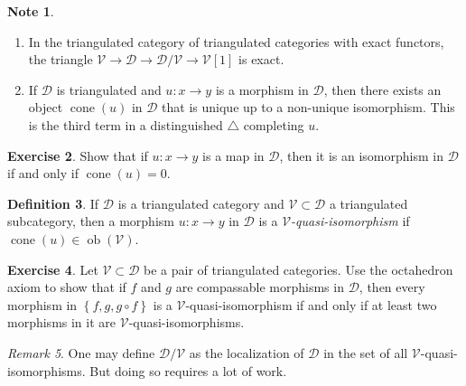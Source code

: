 \documentclass[10pt,letterpaper,cm]{nupset}
\theoremstyle{definition}
\newtheorem{definition}{Definition}[subsection]
\newtheorem{note}[definition]{Note}
\theoremstyle{theorem}
\newtheorem{exercise}[definition]{Exercise}
\theoremstyle{remark}
\newtheorem{remark}[definition]{Remark}
\newcommand{\1}{\mathbf{1}}
\renewcommand{\d}{\mathscr{D}}
\renewcommand{\v}{\mathscr{V}}
\newcommand{\0}{\vec 0}
\DeclareMathOperator{\ob}{ob}
\DeclareMathOperator{\cone}{cone}
\begin{document}
\begin{note} $ $
\begin{enumerate}
\item In the triangulated category of triangulated categories with exact functors, the triangle $\v \to \d \to \d/\v \to \v[1]$ is exact.
\item If $\d$ is triangulated and $u: x \to y$ is a morphism in $\d$, then there exists an object $\cone(u)$ in $\d$ that is unique up to a non-unique isomorphism. This is the third term in a distinguished $\triangle$ completing $u$. 
\end{enumerate}
\end{note}

\begin{exercise}
Show that if $u : x \to y$ is a map in $\d$, then it is an isomorphism in $\d$ if and only if $\cone(u) =0$. 
\end{exercise}

\begin{definition}
If $\d$ is a triangulated category and $\v\subset \d$ a triangulated subcategory, then a morphism $u : x \to y$ in $\d$ is a \textit{$\v$-quasi-isomorphism} if $\cone(u) \in \ob(\v)$.
\end{definition}

\begin{exercise}
Let $\v \subset \d$ be a pair of triangulated categories. Use the octahedron axiom to show that if $f$ and $g$ are compassable morphisms in $\d$, then every morphism in $\left\{f, g, g \circ f\right\}$ is a $\v$-quasi-isomorphism if and only if at least two morphisms in it are $\v$-quasi-isomorphisms. 
\end{exercise}

\begin{remark}
One may define $\d/\v$ as the localization of $\d$ in the set of all $\v$-quasi-isomorphisms. But doing so requires a lot of work. 
\end{remark}
\end{document}
